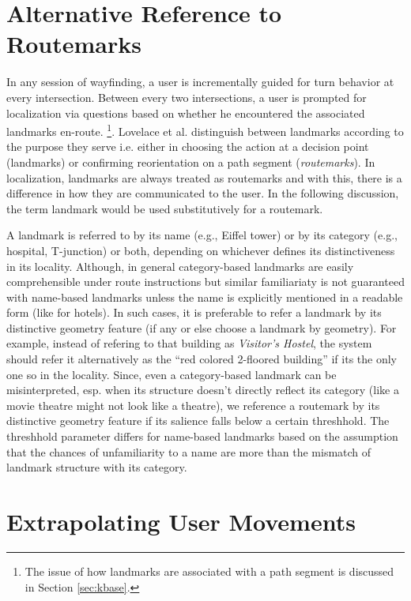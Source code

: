\documentclass{iitkthesis}
\begin{document}
\section{Alternative Reference to Routemarks}
\label{sec:altref}
In any session of wayfinding, a user is incrementally guided for turn 
behavior at every intersection. Between every two intersections, a user is 
prompted for localization via questions based on whether he encountered 
the associated landmarks en-route. \footnote{The issue of how landmarks 
are associated with a path segment is discussed in Section \ref{sec:kbase}.}. 
Lovelace et al. \cite{lovelace} distinguish between landmarks 
according to the purpose they serve i.e. either in choosing the action at 
a decision point (landmarks) or confirming reorientation on a path 
segment (\textit{routemarks}). In localization, landmarks are always 
treated as routemarks and with this, there is a difference in how they 
are communicated to the user. In the following discussion, the term 
landmark would be used substitutively for a routemark. 

A landmark is referred to by its name (e.g., Eiffel tower) or by its 
category (e.g., hospital, T-junction) or both, depending on whichever 
defines its distinctiveness in its locality. Although, in general 
category-based landmarks are easily comprehensible under route 
instructions but similar familiariaty is not guaranteed with name-based 
landmarks unless the name is explicitly mentioned in a readable form 
(like for hotels). In such cases, it is preferable to refer a landmark by 
its distinctive geometry feature (if any or else choose a landmark by 
geometry). For example, instead of refering to that building as 
\textit{Visitor's Hostel}, the system should refer it alternatively as 
the ``red colored 2-floored building'' if its the only one so in the 
locality. Since, even a category-based landmark can be misinterpreted, esp. 
when its structure doesn't directly reflect its category (like a movie 
theatre might not look like a theatre), we reference a routemark by its 
distinctive geometry feature if its salience falls below a certain 
threshhold. The threshhold parameter differs for name-based landmarks 
based on the assumption that the chances of unfamiliarity to a name are 
more than the mismatch of landmark structure with its category.
\section{Extrapolating User Movements}
\end{document}
